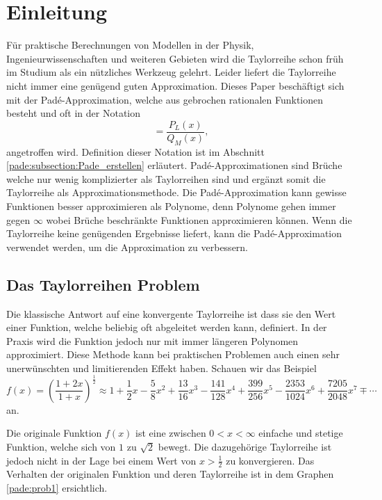 %
%
%
\section{Einleitung\label{pade:section:einleitung}}
Für praktische Berechnungen von Modellen in der Physik, Ingenieurwissenschaften und weiteren Gebieten wird die Taylorreihe schon früh im Studium als ein nützliches Werkzeug gelehrt.
Leider liefert die Taylorreihe nicht immer eine genügend guten Approximation.
Dieses Paper beschäftigt sich mit der Padé-Approximation, welche aus gebrochen rationalen Funktionen besteht und oft in der Notation
\begin{equation*}
[L/M]
=
\frac{P_{L}(x)}{Q_{M}(x)},
\end{equation*}
angetroffen wird. 
Definition dieser Notation ist im Abschnitt \ref{pade:subsection:Pade_erstellen} erläutert.
Padé-Approximationen sind Brüche welche nur wenig komplizierter als Taylorreihen sind und ergänzt somit die Taylorreihe als Approximationsmethode.
Die Padé-Approximation kann gewisse Funktionen besser approximieren als Polynome, denn Polynome gehen immer gegen $\infty$ wobei Brüche beschränkte Funktionen approximieren können.
Wenn die Taylorreihe keine genügenden Ergebnisse liefert, kann die Padé-Approximation verwendet werden, um die Approximation zu verbessern.

 

\subsection{Das Taylorreihen Problem
\label{pade:Taylorfehler}}

Die klassische Antwort auf eine konvergente Taylorreihe ist dass sie den Wert einer Funktion, welche beliebig oft abgeleitet werden kann, definiert. 
In der Praxis wird die Funktion jedoch nur mit immer längeren Polynomen approximiert.
Diese Methode kann bei praktischen Problemen auch einen sehr unerwünschten und limitierenden Effekt haben. 
Schauen wir das Beispiel 
\begin{equation*}
f(x)
=
\left(\frac{1+2x}{1+x}\right)^{\frac{1}{2}}
\approx
1+\frac{1}{2}x - \frac{5}{8}x^2+\frac{13}{16}x^3 -\frac{141}{128}x^4 +\frac{399}{256}x^5 - \frac{2353}{1024}x^6 + \frac{7205}{2048}x^7 \mp \cdots
\end{equation*}
an. 

Die originale Funktion $f(x)$ ist eine zwischen $0<x<\infty$ einfache und stetige Funktion, welche sich von $1$ zu $\sqrt{2}$ bewegt.
Die dazugehörige Taylorreihe ist jedoch nicht in der Lage bei einem Wert von $x>\frac{1}{2}$ zu konvergieren. 
Das Verhalten der originalen Funktion und deren Taylorreihe ist in dem Graphen \ref{pade:prob1} ersichtlich. 

